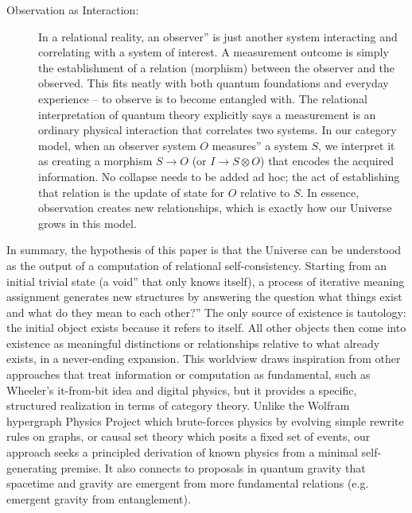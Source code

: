 \documentclass{article}
\begin{document}
\begin{description}
\item[Observation as Interaction:] In a relational reality, an observer'' is just another system interacting and correlating with a system of interest. A measurement outcome is simply the establishment of a relation (morphism) between the observer and the observed. This fits neatly with both quantum foundations and everyday experience -- to observe is to become entangled with. The relational interpretation of quantum theory explicitly says a measurement is an ordinary physical interaction that correlates two systems\cite{rovelli1996}. In our category model, when an observer system $O$ measures'' a system $S$, we interpret it as creating a morphism $S \to O$ (or $I \to S \otimes O$) that encodes the acquired information. No collapse needs to be added ad hoc; the act of establishing that relation is the update of state for $O$ relative to $S$. In essence, observation creates new relationships, which is exactly how our Universe grows in this model.
\end{description}

In summary, the hypothesis of this paper is that the Universe can be understood as the output of a computation of relational self-consistency. Starting from an initial trivial state (a void'' that only knows itself), a process of iterative meaning assignment generates new structures by answering the question what things exist and what do they mean to each other?'' The only source of existence is tautology: the initial object exists because it refers to itself. All other objects then come into existence as meaningful distinctions or relationships relative to what already exists, in a never-ending expansion. This worldview draws inspiration from other approaches that treat information or computation as fundamental, such as Wheeler’s it-from-bit idea\cite{wheeler1989} and digital physics, but it provides a specific, structured realization in terms of category theory. Unlike the Wolfram hypergraph Physics Project which brute-forces physics by evolving simple rewrite rules on graphs\cite{wolfram2020}, or causal set theory which posits a fixed set of events, our approach seeks a principled derivation of known physics from a minimal self-generating premise. It also connects to proposals in quantum gravity that spacetime and gravity are emergent from more fundamental relations (e.g. emergent gravity from entanglement\cite{vanraamsdonk2010}).
\end{document}
